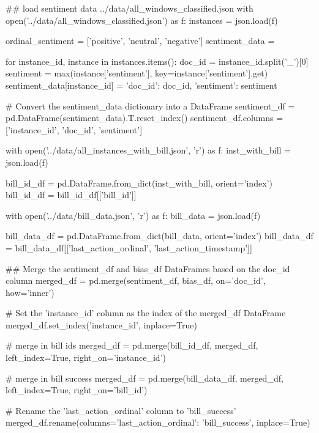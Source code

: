 \begin{pyin}
\## load sentiment data ../data/all_windows_classified.json
with open('../data/all_windows_classified.json') as f:
    instances = json.load(f)

ordinal_sentiment = ['positive', 'neutral', 'negative']
sentiment_data = {}

for instance_id, instance in instances.items():
    doc_id = instance_id.split('_')[0]
    sentiment = max(instance['sentiment'], key=instance['sentiment'].get)
    sentiment_data[instance_id] = {
        'doc_id': doc_id,
        'sentiment': sentiment
    }

# Convert the sentiment_data dictionary into a DataFrame
sentiment_df = pd.DataFrame(sentiment_data).T.reset_index()
sentiment_df.columns = ['instance_id', 'doc_id', 'sentiment']
\end{pyin}

\begin{pyin}
with open('../data/all_instances_with_bill.json', 'r') as f:
    inst_with_bill = json.load(f)

bill_id_df = pd.DataFrame.from_dict(inst_with_bill, orient='index')
bill_id_df = bill_id_df[['bill_id']]
\end{pyin}

\begin{pyin}
with open('../data/bill_data.json', 'r') as f:
    bill_data = json.load(f)

bill_data_df = pd.DataFrame.from_dict(bill_data, orient='index')
bill_data_df = bill_data_df[['last_action_ordinal', 'last_action_timestamp']]
\end{pyin}

\begin{pyin}
\## Merge the sentiment_df and bias_df DataFrames based on the doc_id column
merged_df = pd.merge(sentiment_df, bias_df, on='doc_id', how='inner')

# Set the 'instance_id' column as the index of the merged_df DataFrame
merged_df.set_index('instance_id', inplace=True)

# merge in bill ids
merged_df = pd.merge(bill_id_df, merged_df, left_index=True, right_on='instance_id')

# merge in bill success
merged_df = pd.merge(bill_data_df, merged_df, left_index=True, right_on='bill_id')

# Rename the 'last_action_ordinal' column to 'bill_success'
merged_df.rename(columns={'last_action_ordinal': 'bill_success'}, inplace=True)
\end{pyin}

